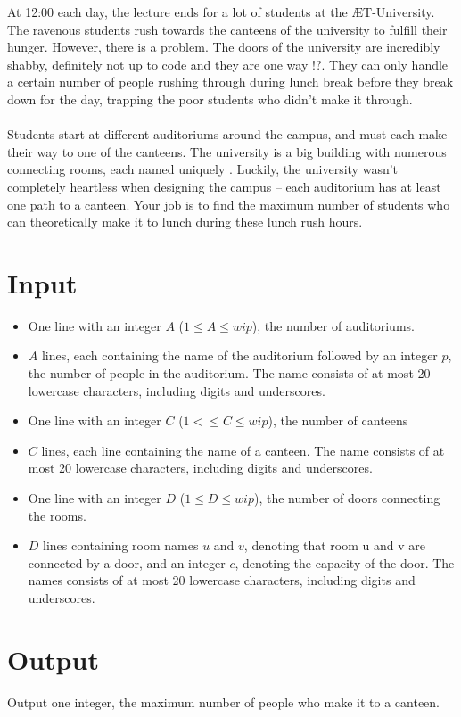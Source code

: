 At 12:00 each day, the lecture ends for a lot of students at the ÆT-University. The ravenous students rush towards the canteens of the university to fulfill their hunger. 
However, there is a problem. The doors of the university are incredibly shabby, definitely not up to code and they are one way \(!?\). They can only handle a certain number of people 
rushing through during lunch break before they break down for the day, trapping the poor students who didn’t make it through.
\\\\
Students start at different auditoriums around the campus, and must each make their way to one of the canteens. The university is a big building with numerous connecting rooms, 
each named uniquely . Luckily, the university wasn't completely heartless when designing the campus -- each auditorium has at least one path to a canteen. 
Your job is to find the maximum number of students who can theoretically make it to lunch during these lunch rush hours.

\section*{Input}
\begin{itemize}
    \item One line with an integer $A$ ($1 \leq A \le wip$), the number of auditoriums.
    \item $A$ lines, each containing the name of the auditorium followed by an integer $p$, the number of people in the auditorium. The name consists of at most 20 lowercase characters, including digits and underscores.
    \item One line with an integer $C$ ($1 <\leq C \le wip$), the number of canteens
    \item $C$ lines, each line containing the name of a canteen. The name consists of at most 20 lowercase characters, including digits and underscores.
    \item One line with an integer $D$ ($1 \leq D \le wip$), the number of doors connecting the rooms.
    \item $D$ lines containing room names $u$ and $v$, denoting that room u and v are connected by a door, and an integer $c$, denoting the capacity of the door. The names consists of at most 20 lowercase characters, including digits and underscores.


\end{itemize}

\section*{Output}
Output one integer, the maximum number of people who make it to a canteen.
